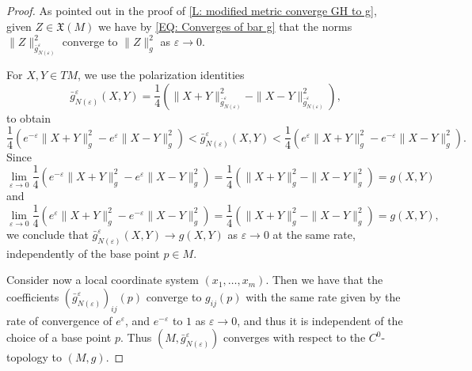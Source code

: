 \documentclass[10pt,a4paper]{amsart}
\newcommand{\X}{\mathfrak{X}}
\begin{document}
\begin{proof}
As pointed out in the proof of \th\ref{L: modified metric converge GH to g}, given $Z\in \X(M)$ we have by \eqref{EQ: Converges of bar g} that the norms $\|Z\|^2_{\bar{g}^\varepsilon_{N(\varepsilon)}}$ converge to $\|Z\|^2_g$ as $\varepsilon\to 0$.

For $X,Y\in TM$, we use the polarization identities 
\[
\bar{g}^\varepsilon_{N(\varepsilon)}(X,Y) = \frac{1}{4}\left(\|X+Y\|^2_{\bar{g}^\varepsilon_{N(\varepsilon)}}-\|X-Y\|^2_{\bar{g}^\varepsilon_{N(\varepsilon)}}\right),
\]
to obtain
\[
\frac{1}{4}\left(e^{-\varepsilon}\|X+Y\|^2_{g}-e^\varepsilon\|X-Y\|^2_{g}\right)<\bar{g}^\varepsilon_{N(\varepsilon)}(X,Y)<\frac{1}{4}\left(e^{\varepsilon}\|X+Y\|^2_{g}-e^{-\varepsilon}\|X-Y\|^2_{g}\right).
\]
Since 
\[\lim_{\varepsilon\to 0}\frac{1}{4}\left(e^{-\varepsilon}\|X+Y\|^2_{g}-e^\varepsilon\|X-Y\|^2_{g}\right) = \frac{1}{4}\left(\|X+Y\|^2_{g}-\|X-Y\|^2_{g}\right) = g(X,Y)
\]
and 
\[\lim_{\varepsilon\to 0}\frac{1}{4}\left(e^{\varepsilon}\|X+Y\|^2_{g}-e^{-\varepsilon}\|X-Y\|^2_{g}\right) = \frac{1}{4}\left(\|X+Y\|^2_{g}-\|X-Y\|^2_{g}\right) = g(X,Y),
\]
we conclude that $\bar{g}^\varepsilon_{N(\varepsilon)}(X,Y)\to g(X,Y)$ as $\varepsilon\to 0$  at the same rate, independently of the base point $p\in M$.

Consider now a local coordinate system $(x_1,\ldots,x_m)$. Then we have that the coefficients $(\bar{g}^\varepsilon_{N(\varepsilon)})_{ij}(p)$ converge to $g_{ij}(p)$ with the same rate given by the rate of convergence of $e^\varepsilon$, and $e^{-\varepsilon}$ to $1$ as $\varepsilon\to 0$, and thus it is independent of the choice of a base point $p$.  Thus $(M,\bar{g}^\varepsilon_{N(\varepsilon)})$ converges with respect to the $C^0$-topology to $(M,g)$.
\end{proof}
\end{document}
